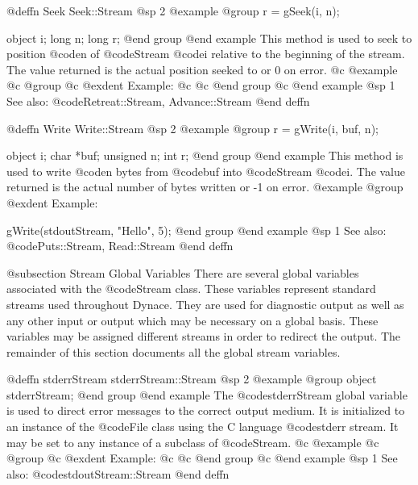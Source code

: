 @deffn {Seek} Seek::Stream
@sp 2
@example
@group
r = gSeek(i, n);

object  i;
long    n;
long    r;
@end group
@end example
This method is used to seek to position @code{n} of @code{Stream}
@code{i} relative to the beginning of the stream.
The value returned is the actual position seeked to or 0 on error.
@c @example
@c @group
@c @exdent Example:
@c  
@c @end group
@c @end example
@sp 1
See also:  @code{Retreat::Stream, Advance::Stream}
@end deffn



















@deffn {Write} Write::Stream
@sp 2
@example
@group
r = gWrite(i, buf, n);

object  i;
char    *buf;
unsigned n;
int     r;
@end group
@end example
This method is used to write @code{n} bytes from @code{buf} into
@code{Stream} @code{i}.  The value returned is the actual number
of bytes written or -1 on error.
@example
@group
@exdent Example:
 
gWrite(stdoutStream, "Hello", 5);
@end group
@end example
@sp 1
See also:  @code{Puts::Stream, Read::Stream}
@end deffn




@subsection Stream Global Variables
There are several global variables associated with the @code{Stream}
class.  These variables represent standard streams used throughout
Dynace.  They are used for diagnostic output as well as any other input
or output which may be necessary on a global basis.  These variables may
be assigned different streams in order to redirect the output.  The
remainder of this section documents all the global stream variables.




@deffn {stderrStream} stderrStream::Stream
@sp 2
@example
@group
object  stderrStream;
@end group
@end example
The @code{stderrStream} global variable is used to direct error
messages to the correct output medium.  It is initialized to
an instance of the @code{File} class using the C language
@code{stderr} stream.  It may be set to any instance of a
subclass of @code{Stream}.
@c @example
@c @group
@c @exdent Example:
@c 
@c @end group
@c @end example
@sp 1
See also:  @code{stdoutStream::Stream}
@end deffn









